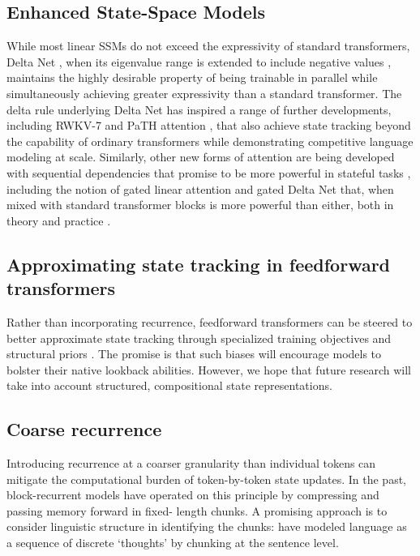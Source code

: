 \documentclass{article}
\begin{document}
\subsection{Enhanced State-Space Models}
While most linear SSMs do not exceed the expressivity of standard transformers, 
Delta Net \citep{schlag2021}, when its eigenvalue range is extended to include negative 
values \citep{grazzi2025}, maintains the
highly desirable property of being trainable in parallel while simultaneously achieving
greater expressivity than a standard transformer. The delta rule underlying Delta Net
has inspired a range of further developments, including
RWKV-7 \citep{peng2025rwkv} and PaTH attention \citep{yang2025path}, that also
achieve state tracking beyond the capability of ordinary transformers while demonstrating
competitive language modeling at scale.
Similarly, other new forms of attention are being developed with
sequential dependencies that promise to be more powerful in stateful tasks 
\citep{lin2025forgetting,leviathan2025selective,beltagy2020longformer}, including the 
notion of gated linear attention \citep{Yang2024gatedlinearattention} and gated
Delta Net \citep{yang2025gated} that, when mixed with
standard transformer blocks is more powerful than either, both in
theory and practice \citep{merrill2026olmohybrid}.

\subsection{Approximating state tracking in feedforward transformers}
Rather than incorporating recurrence, feedforward transformers can be steered 
to better approximate state tracking through specialized training objectives and 
structural priors \citep{hu2025,teoh2025,huang2026semantictubepredictionbeating}.
The promise is that such biases will encourage models to bolster their
native lookback abilities. However, we hope that future research will take
into account structured, compositional state representations.

\subsection{Coarse recurrence}
Introducing recurrence at a coarser granularity than individual tokens can mitigate 
the computational burden of token-by-token state updates. In the past, block-recurrent
models have operated on this principle by compressing and passing memory forward in fixed-
length chunks. A promising approach is to consider linguistic structure in identifying
the chunks: \citet{borazjanizadeh2026} have modeled language as a sequence of discrete `thoughts' by chunking at the sentence level.
\end{document}
